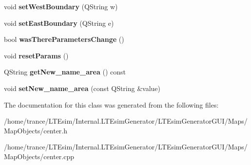 \begin{DoxyCompactItemize}
\item 
void {\bfseries set\+West\+Boundary} (Q\+String w)\hypertarget{class_center_a51b698ef4f9dc546e424f407227d1312}{}\label{class_center_a51b698ef4f9dc546e424f407227d1312}

\item 
void {\bfseries set\+East\+Boundary} (Q\+String e)\hypertarget{class_center_a3ab8f4cb137afd4c761f40897708bf66}{}\label{class_center_a3ab8f4cb137afd4c761f40897708bf66}

\item 
bool {\bfseries was\+There\+Parameters\+Change} ()\hypertarget{class_center_a20e04053568aba3080700405fa300836}{}\label{class_center_a20e04053568aba3080700405fa300836}

\item 
void {\bfseries reset\+Params} ()\hypertarget{class_center_ae2022a3991d768457d0fea5ed770806b}{}\label{class_center_ae2022a3991d768457d0fea5ed770806b}

\item 
Q\+String {\bfseries get\+New\+\_\+name\+\_\+area} () const \hypertarget{class_center_a32d7edd54da76cd8df24ddedb19a5e6b}{}\label{class_center_a32d7edd54da76cd8df24ddedb19a5e6b}

\item 
void {\bfseries set\+New\+\_\+name\+\_\+area} (const Q\+String \&value)\hypertarget{class_center_a6187917c791160f679e266c81f1dd41b}{}\label{class_center_a6187917c791160f679e266c81f1dd41b}

\end{DoxyCompactItemize}


The documentation for this class was generated from the following files\+:\begin{DoxyCompactItemize}
\item 
/home/trance/\+L\+T\+Esim/\+Internal.\+L\+T\+Esim\+Generator/\+L\+T\+Esim\+Generator\+G\+U\+I/\+Maps/\+Map\+Objects/center.\+h\item 
/home/trance/\+L\+T\+Esim/\+Internal.\+L\+T\+Esim\+Generator/\+L\+T\+Esim\+Generator\+G\+U\+I/\+Maps/\+Map\+Objects/center.\+cpp\end{DoxyCompactItemize}
